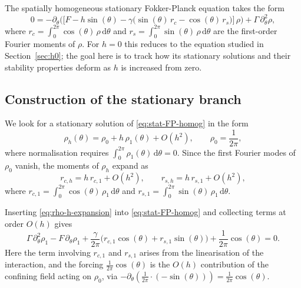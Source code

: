 \documentclass[a4paper,11pt]{article}
\theoremstyle{plain}
\theoremstyle{definition}
\theoremstyle{remark}
\newcommand{\dd}{\,\mathrm{d}}
\begin{document}
The spatially homogeneous stationary Fokker-Planck equation takes the form
\begin{equation}\label{eq:stat-FP-homog}
    0 = -\partial_\theta\Big(\big[F - h\sin(\theta)
    - \gamma\big(\sin(\theta)\, r_c - \cos(\theta)\, r_s\big)\big]\,\rho\Big)
    + \Gamma\,\partial_\theta^2\rho,
\end{equation}
where $r_c = \int_0^{2\pi}\cos(\theta)\,\rho\dd\theta$ and $r_s = \int_0^{2\pi}\sin(\theta)\,\rho\dd\theta$ are the first-order Fourier moments of $\rho$. For $h = 0$ this reduces to the equation studied in Section~\ref{sec:h0}; the goal here is to track how its stationary solutions and their stability properties deform as $h$ is increased from zero.

\subsection{Construction of the stationary branch}\label{subsec:rho-h}
We look for a stationary solution of \eqref{eq:stat-FP-homog} in the form
\begin{equation}\label{eq:rho-h-expansion}
    \rho_h(\theta) = \rho_0 + h\,\rho_1(\theta) + O(h^2), \qquad
    \rho_0 = \frac{1}{2\pi},
\end{equation}
where normalisation requires $\int_0^{2\pi}\rho_1(\theta)\dd\theta = 0$. Since the first Fourier modes of $\rho_0$ vanish, the moments of $\rho_h$ expand as
\[
    r_{c,h} = h\,r_{c,1} + O(h^2), \qquad r_{s,h} = h\,r_{s,1} + O(h^2),
\]
where $r_{c,1} = \int_0^{2\pi}\cos(\theta)\,\rho_1\dd\theta$ and $r_{s,1} = \int_0^{2\pi}\sin(\theta)\,\rho_1\dd\theta$.

Inserting \eqref{eq:rho-h-expansion} into \eqref{eq:stat-FP-homog} and collecting terms at order $O(h)$ gives
\begin{equation}\label{eq:rho1-ODE-moments}
    \Gamma\,\partial_\theta^2 \rho_1
    - F\,\partial_\theta \rho_1
    + \frac{\gamma}{2\pi}\Big(r_{c,1}\cos(\theta) + r_{s,1}\sin(\theta)\Big)
    + \frac{1}{2\pi}\cos(\theta) = 0.
\end{equation}
Here the term involving $r_{c,1}$ and $r_{s,1}$ arises from the linearisation of the interaction, and the forcing $\frac{1}{2\pi}\cos(\theta)$ is the $O(h)$ contribution of the confining field acting on $\rho_0$, via $-\partial_\theta(\frac{1}{2\pi}\cdot(-\sin(\theta))) = \frac{1}{2\pi}\cos(\theta)$.
\end{document}

